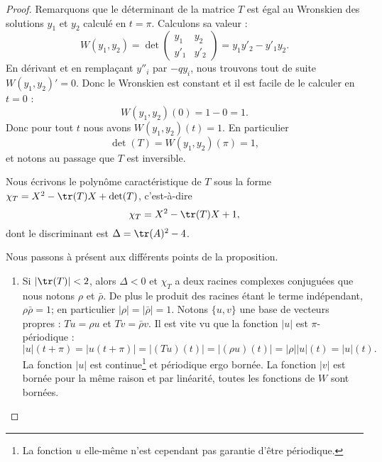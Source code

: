 \begin{proof}
	Remarquons que le déterminant de la matrice \( T\) est égal au Wronskien des solutions \( y_1\) et \( y_2\) calculé en \( t=\pi\). Calculons sa valeur :
	\begin{equation}
		W(y_1,y_2)=\det\begin{pmatrix}
			y_1  & y_2  \\
			y'_1 & y'_2
		\end{pmatrix}=y_1y'_2-y'_1y_2.
	\end{equation}
	En dérivant et en remplaçant \( y''_i\) par \( -qy_i\), nous trouvons tout de suite \( W(y_1,y_2)'=0\). Donc le Wronskien est constant et il est facile de le calculer en \( t=0\) :
	\begin{equation}
		W(y_1,y_2)(0)=1-0=1.
	\end{equation}
	Donc pour tout \( t\) nous avons \( W(y_1,y_2)(t)=1\). En particulier
	\begin{equation}
		\det(T)=W(y_1,y_2)(\pi)=1,
	\end{equation}
	et notons au passage que \( T\) est inversible.

	Nous écrivons le polynôme caractéristique de \( T\) sous la forme \( \chi_T=X^2-\tr(T)X+\det(T)\), c'est-à-dire
	\begin{equation}
		\chi_T=X^2-\tr(T)X+1,
	\end{equation}
	dont le discriminant est \( \Delta=\tr(A)^2-4\).

	Nous passons à présent aux différents points de la proposition.
	\begin{enumerate}
		\item
		      Si \( | \tr(T) |<2\), alors \( \Delta<0\) et \( \chi_T\) a deux racines complexes conjuguées que nous notons \( \rho\) et \( \bar\rho\). De plus le produit des racines étant le terme indépendant, \( \rho\bar\rho=1\); en particulier \( | \rho |=| \bar \rho |=1\). Notons \( \{ u,v \}\) une base de vecteurs propres : \( Tu=\rho u\) et \( Tv=\bar \rho v\). Il est vite vu que la fonction \( | u |\) est \( \pi\)-périodique :
		      \begin{equation}
			      | u |(t+\pi)=| u(t+\pi) |=| (Tu)(t) |=| (\rho u)(t) |=| \rho | | u |(t)=| u |(t).
		      \end{equation}
		      La fonction \( | u |\) est continue\footnote{La fonction \( u\) elle-même n'est cependant pas garantie d'être périodique.} et périodique ergo bornée. La fonction \( | v |\) est bornée pour la même raison et par linéarité, toutes les fonctions de \( W\) sont bornées.


\end{enumerate}
\end{proof}

